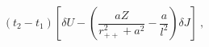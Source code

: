 \begin{equation}
(t_2-t_1) \left[\delta U - \left(\frac{aZ}{r_{++}^2+a^2} - \frac{a}{l^2}  \right) \delta J \right] \ ,
\label{s}
\end{equation}

